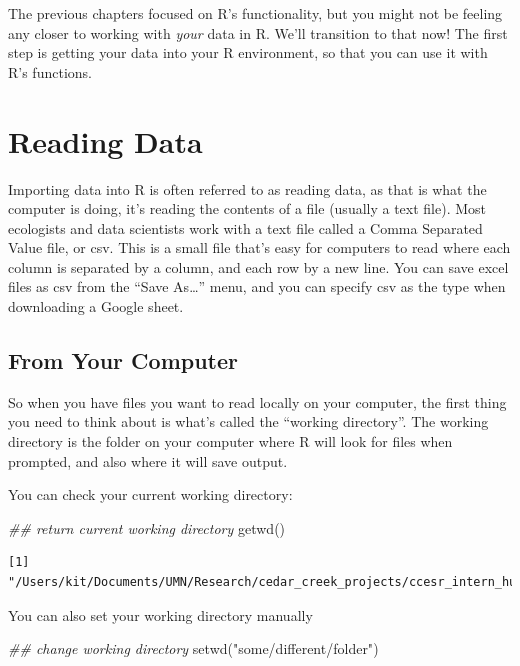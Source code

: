 \documentclass[
  letterpaper,
  DIV=11,
  numbers=noendperiod]{scrreprt}
\newenvironment{Shaded}{\begin{snugshade}}{\end{snugshade}}
\newcommand{\DocumentationTok}[1]{\textcolor[rgb]{0.37,0.37,0.37}{\textit{#1}}}
\newcommand{\FunctionTok}[1]{\textcolor[rgb]{0.28,0.35,0.67}{#1}}
\newcommand{\NormalTok}[1]{\textcolor[rgb]{0.00,0.23,0.31}{#1}}
\newcommand{\StringTok}[1]{\textcolor[rgb]{0.13,0.47,0.30}{#1}}
\begin{document}
The previous chapters focused on R's functionality, but you might not be
feeling any closer to working with \emph{your} data in R. We'll
transition to that now! The first step is getting your data into your R
environment, so that you can use it with R's functions.

\section{Reading Data}\label{reading-data}

Importing data into R is often referred to as reading data, as that is
what the computer is doing, it's reading the contents of a file (usually
a text file). Most ecologists and data scientists work with a text file
called a Comma Separated Value file, or csv. This is a small file that's
easy for computers to read where each column is separated by a column,
and each row by a new line. You can save excel files as csv from the
``Save As\ldots{}'' menu, and you can specify csv as the type when
downloading a Google sheet.

\subsection{From Your Computer}\label{from-your-computer}

So when you have files you want to read locally on your computer, the
first thing you need to think about is what's called the ``working
directory''. The working directory is the folder on your computer where
R will look for files when prompted, and also where it will save output.

You can check your current working directory:

\begin{Shaded}
\begin{Highlighting}[]
\DocumentationTok{\#\# return current working directory}
\FunctionTok{getwd}\NormalTok{()}
\end{Highlighting}
\end{Shaded}

\begin{verbatim}
[1] "/Users/kit/Documents/UMN/Research/cedar_creek_projects/ccesr_intern_hub"
\end{verbatim}

You can also set your working directory manually

\begin{Shaded}
\begin{Highlighting}[]
\DocumentationTok{\#\# change working directory}
\FunctionTok{setwd}\NormalTok{(}\StringTok{"some/different/folder"}\NormalTok{)}
\end{Highlighting}
\end{Shaded}
\end{document}

